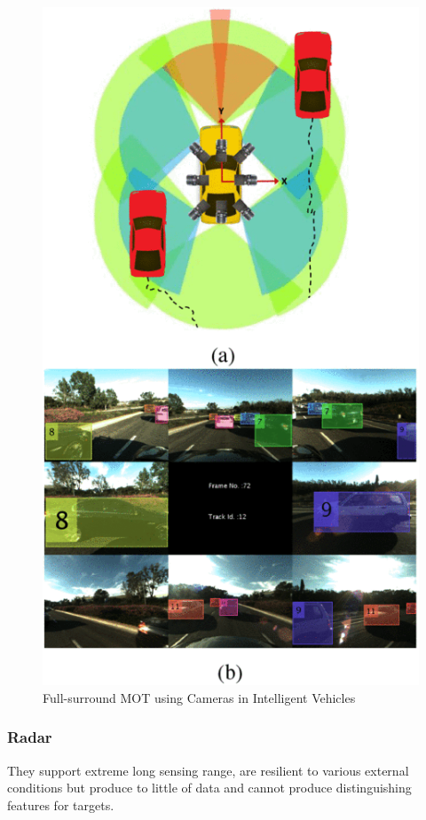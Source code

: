 \begin{spacing}{1.5}
\begin{sloppypar}
\begin{figure}[h]
\begin{center}
\includegraphics[scale=0.5]{2/camera.png}
\caption{Full-surround MOT using Cameras in Intelligent Vehicles}
\label{fig:camera}
\end{center}
\end{figure}
\subsubsection{Radar}
They support extreme long sensing range, are resilient to various external conditions but produce to little of data and cannot produce distinguishing features for targets.


\end{sloppypar}
\end{spacing}
